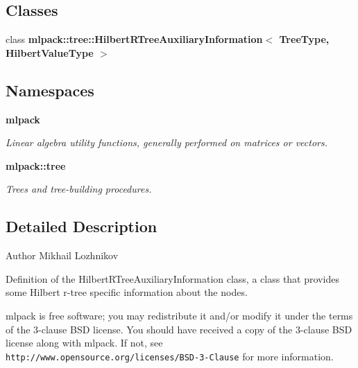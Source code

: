 \subsection*{Classes}
\begin{DoxyCompactItemize}
\item 
class {\bf mlpack\+::tree\+::\+Hilbert\+R\+Tree\+Auxiliary\+Information$<$ Tree\+Type, Hilbert\+Value\+Type $>$}
\end{DoxyCompactItemize}
\subsection*{Namespaces}
\begin{DoxyCompactItemize}
\item 
 {\bf mlpack}
\begin{DoxyCompactList}\small\item\em Linear algebra utility functions, generally performed on matrices or vectors. \end{DoxyCompactList}\item 
 {\bf mlpack\+::tree}
\begin{DoxyCompactList}\small\item\em Trees and tree-\/building procedures. \end{DoxyCompactList}\end{DoxyCompactItemize}


\subsection{Detailed Description}
\begin{DoxyAuthor}{Author}
Mikhail Lozhnikov
\end{DoxyAuthor}
Definition of the Hilbert\+R\+Tree\+Auxiliary\+Information class, a class that provides some Hilbert r-\/tree specific information about the nodes.

mlpack is free software; you may redistribute it and/or modify it under the terms of the 3-\/clause B\+SD license. You should have received a copy of the 3-\/clause B\+SD license along with mlpack. If not, see {\tt http\+://www.\+opensource.\+org/licenses/\+B\+S\+D-\/3-\/\+Clause} for more information. 